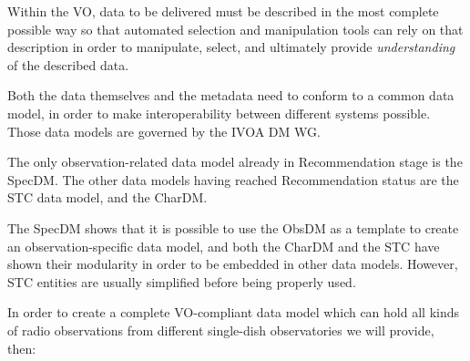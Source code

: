 		Within the VO, data to be delivered must be described in
		the most complete possible way so that automated selection
		and manipulation tools can rely on that description in
		order to manipulate, select, and ultimately provide
		\emph{understanding} of the described data.
		
		 Both the data themselves and the metadata need to conform
		to a common data model, in order to make interoperability
		between different systems possible. Those data models are
		governed by the IVOA DM WG.
		
		 The only observation-related data model already in
		Recommendation stage is the SpecDM. The other data models
		having reached Recommendation status are the STC data model,
		and the CharDM.
		
		 The SpecDM shows that it is possible to use the ObsDM as
		a template to create an observation-specific data model,
		and both the CharDM and the STC have shown their modularity
		in order to be embedded in other data models. However, 
		STC entities are usually simplified before being properly
		used.
		
		 In order to create a complete VO-compliant data model
		which can hold all kinds of radio observations from
		different single-dish observatories we will provide, then:
		
